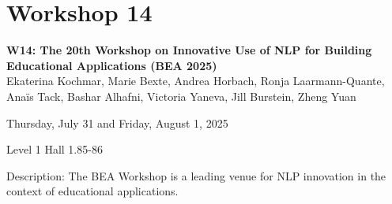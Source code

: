 \clearpage



\section[W14: The 20th Workshop on Innovative Use of NLP for Building Educational Applications (BEA 2025)]{Workshop 14}
\label{workshop_14_1}
\label{workshop_14_2}

\begin{center}
    {\Large \textbf{W14: The 20th Workshop on Innovative Use of NLP for Building Educational Applications (BEA 2025)}}\\
    

    Ekaterina Kochmar, Marie Bexte, Andrea Horbach, Ronja Laarmann-Quante, Anaïs Tack, Bashar Alhafni, Victoria Yaneva, Jill Burstein, Zheng Yuan
    
    Thursday, July 31 and Friday, August 1, 2025
    
    Level 1 Hall 1.85-86

\end{center}

Description: The BEA Workshop is a leading venue for NLP innovation in the context of educational applications.

